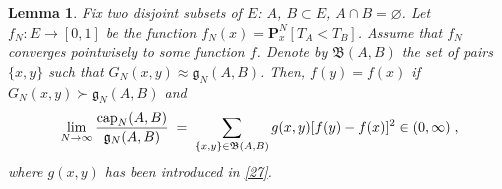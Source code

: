 \documentclass[reqno]{amsart}
\newtheorem{lemma}[theorem]{Lemma}
\begin{document}
\begin{lemma}
\label{s21}
Fix two disjoint subsets of $E$: $A$, $B\subset E$, $A\cap
B=\varnothing$. Let $f_N : E\to [0,1]$ be the function $f_N(x) = {{\mathbf P}}^N_x[T_A < T_B]$. Assume that $f_N$ converges pointwisely to some
function $f$. Denote by ${{\mathfrak B}}(A,B)$ the set of pairs $\{x,y\}$ such
that $G_N(x,y) \approx {{\mathfrak g}}_N(A,B)$.  Then, $f(y)=f(x)$ if $G_N(x,y)
\succ {{\mathfrak g}}_N(A,B)$ and 
\begin{equation*}
\lim_{N\to\infty} \frac {{{\rm cap}}_N(A,B)}{{{\mathfrak g}}_N(A,B)}  \;=\; 
\sum_{\{x,y\} \in {{\mathfrak B}}(A,B)} g(x,y) [f (y) - f (x)]^2 
\in (0,\infty)\;,
\end{equation*}
where $g(x,y)$ has been introduced in \eqref{27}.
\end{lemma}
\end{document}

